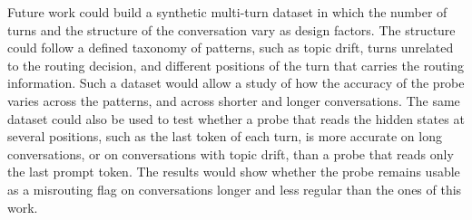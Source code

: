 Future work could build a synthetic multi-turn dataset in which the number of turns and the structure of the conversation vary as design factors. The structure could follow a defined taxonomy of patterns, such as topic drift, turns unrelated to the routing decision, and different positions of the turn that carries the routing information. Such a dataset would allow a study of how the accuracy of the probe varies across the patterns, and across shorter and longer conversations. The same dataset could also be used to test whether a probe that reads the hidden states at several positions, such as the last token of each turn, is more accurate on long conversations, or on conversations with topic drift, than a probe that reads only the last prompt token. The results would show whether the probe remains usable as a misrouting flag on conversations longer and less regular than the ones of this work.

